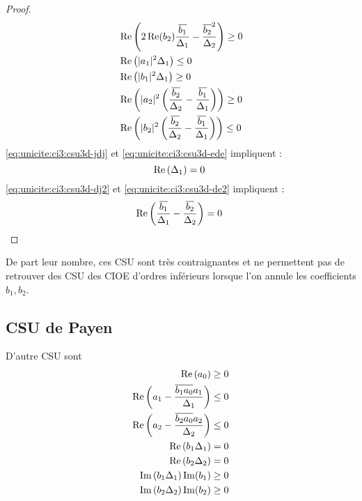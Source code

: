 \begin{proof}
\begin{minipage}{0.49\textwidth}
\begin{align}
        \label{eq:unicite:ci3:csu3d-ere}&\Re\left(2\Re(b_2)\frac{\conj{b_1}}{\Delta_1}-\frac{\conj{b_2}^2}{\Delta_2}\right) \ge 0\\
        \label{eq:unicite:ci3:csu3d-jdj}&\Re\left(|a_1|^2\Delta_1\right) \le 0 \\
        \label{eq:unicite:ci3:csu3d-ede}&\Re\left(|b_1|^2\Delta_1\right) \ge 0 \\
        \label{eq:unicite:ci3:csu3d-dj2}&\Re\left(|a_2|^2\left(\frac{\conj{b_2}}{\Delta_2}-\frac{\conj{b_1}}{\Delta_1}\right)\right)\ge 0\\
        \label{eq:unicite:ci3:csu3d-de2}&\Re\left(|b_2|^2\left(\frac{\conj{b_2}}{\Delta_2}-\frac{\conj{b_1}}{\Delta_1}\right)\right)\le 0
      \end{align}
      \eqref{eq:unicite:ci3:csu3d-jdj} et \eqref{eq:unicite:ci3:csu3d-ede} impliquent :
      \begin{equation}
        \Re\left(\Delta_1\right) = 0\\\
      \end{equation}
      \eqref{eq:unicite:ci3:csu3d-dj2} et \eqref{eq:unicite:ci3:csu3d-de2} impliquent :
      \begin{equation}
        \Re\left(\frac{\conj{b_1}}{\Delta_1}-\frac{\conj{b_2}}{\Delta_2}\right) = 0\\\
      \end{equation}
    \end{minipage}
  \end{proof}
  De part leur nombre, ces CSU sont très contraignantes et ne permettent pas de retrouver des CSU des CIOE d'ordres inférieurs lorsque l'on annule les coefficients \(b_1, b_2\). 


\subsection{CSU de Payen}

  \begin{prop}
    D'autre CSU sont
    \begin{align}
      \Re\left(a_0\right)\ge 0 \\
      \Re\left(a_1 - \frac{\conj{b_1a_0}a_1}{\Delta_1}\right) \le 0 \\
      \Re\left(a_2 - \frac{\conj{b_2a_0}a_2}{\Delta_2}\right) \le 0 \\
      \Re\left(b_1\Delta_1\right) = 0 \\
      \Re\left(b_2\Delta_2\right) = 0 \\
      \Im\left(b_1\Delta_1\right)\Im(b_1)\ge 0\\
      \Im\left(b_2\Delta_2\right)\Im(b_2)\ge 0
    \end{align}
  \end{prop}

